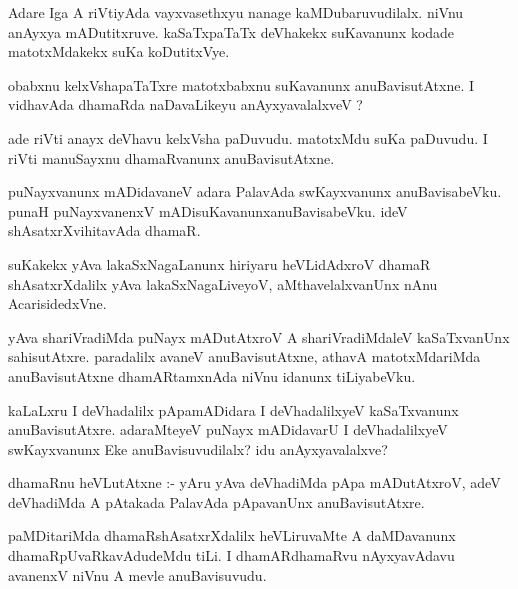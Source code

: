 \documentclass{article}
\begin{document}
\begin{mn}
Adare Iga A riVtiyAda vayxvasethxyu  nanage kaMDubaruvudilalx. niVnu anAyxya 
mADutitxruve. kaSaTxpaTaTx deVhakekx suKavanunx kodade matotxMdakekx suKa koDutitxVye.               
\end{mn}

\begin{mn}
obabxnu kelxVshapaTaTxre  matotxbabxnu suKavanunx anuBavisutAtxne. I vidhavAda 
dhamaRda naDavaLikeyu anAyxyavalalxveV ?
\end{mn}

\begin{mn}
ade riVti anayx deVhavu kelxVsha paDuvudu.  matotxMdu suKa paDuvudu.  I riVti
 manuSayxnu dhamaRvanunx anuBavisutAtxne.
\end{mn}

\begin{mn}
puNayxvanunx mADidavaneV adara PalavAda  swKayxvanunx anuBavisabeVku. punaH 
puNayxvanenxV mADisuKavanunxanuBavisabeVku. ideV shAsatxrXvihitavAda dhamaR.
\end{mn}

\begin{mn}
suKakekx yAva lakaSxNagaLanunx hiriyaru heVLidAdxroV dhamaR shAsatxrXdalilx 
yAva lakaSxNagaLiveyoV, aMthavelalxvanUnx nAnu AcarisidedxVne.
\end{mn}

\begin{mn}
yAva shariVradiMda puNayx mADutAtxroV A shariVradiMdaleV kaSaTxvanUnx 
sahisutAtxre.  paradalilx avaneV anuBavisutAtxne, athavA matotxMdariMda 
anuBavisutAtxne dhamARtamxnAda niVnu idanunx tiLiyabeVku.
\end{mn}

\begin{mn}
kaLaLxru I deVhadalilx pApamADidara  I deVhadalilxyeV kaSaTxvanunx anuBavisutAtxre. 
 adaraMteyeV puNayx mADidavarU I deVhadalilxyeV  swKayxvanunx Eke 
 anuBavisuvudilalx? idu anAyxyavalalxve?
\end{mn}

\begin{mn}
dhamaRnu heVLutAtxne :- yAru yAva deVhadiMda pApa mADutAtxroV, adeV deVhadiMda
 A pAtakada PalavAda pApavanUnx anuBavisutAtxre.
\end{mn}

\begin{mn}
paMDitariMda dhamaRshAsatxrXdalilx heVLiruvaMte A daMDavanunx dhamaRpUvaRkavAdudeMdu 
tiLi. I dhamARdhamaRvu nAyxyavAdavu avanenxV niVnu A mevle anuBavisuvudu.
\end{mn}
\end{document}
